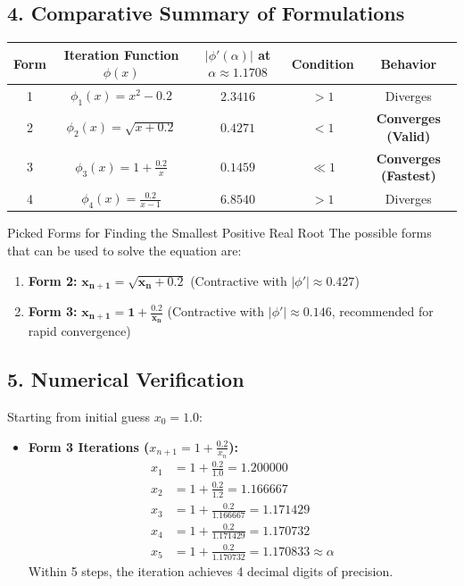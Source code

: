 \documentclass[11pt,a4paper]{article}
\newcommand{\abs}[1]{\left\lvert#1\right\rvert}
\begin{document}
\subsection*{4. Comparative Summary of Formulations}

\begin{center}
\renewcommand{\arraystretch}{1.2}
\small
\begin{tabular}{ccccc}
\toprule
\textbf{Form} & \textbf{Iteration Function $\phi(x)$} & $\abs{\phi'(\alpha)}$ at $\alpha \approx 1.1708$ & \textbf{Condition} & \textbf{Behavior} \\
\midrule
1 & $\phi_1(x) = x^2 - 0.2$ & $2.3416$ & $> 1$ & Diverges \\
2 & $\phi_2(x) = \sqrt{x + 0.2}$ & $0.4271$ & $< 1$ & \textbf{Converges (Valid)} \\
3 & $\phi_3(x) = 1 + \frac{0.2}{x}$ & $0.1459$ & $\ll 1$ & \textbf{Converges (Fastest)} \\
4 & $\phi_4(x) = \frac{0.2}{x - 1}$ & $6.8540$ & $> 1$ & Diverges \\
\bottomrule
\end{tabular}
\end{center}

\begin{answerbox}{Picked Forms for Finding the Smallest Positive Real Root}
The possible forms that can be used to solve the equation are:
\begin{enumerate}[leftmargin=*]
    \item \textbf{Form 2:} $\mathbf{x_{n+1} = \sqrt{x_n + 0.2}}$ \quad (Contractive with $\abs{\phi'} \approx 0.427$)
    \item \textbf{Form 3:} $\mathbf{x_{n+1} = 1 + \frac{0.2}{x_n}}$ \quad (Contractive with $\abs{\phi'} \approx 0.146$, recommended for rapid convergence)
\end{enumerate}
\end{answerbox}

\subsection*{5. Numerical Verification}
Starting from initial guess $x_0 = 1.0$:
\begin{itemize}[leftmargin=*]
    \item \textbf{Form 3 Iterations ($x_{n+1} = 1 + \frac{0.2}{x_n}$):}
    \begin{align*}
        x_1 &= 1 + \frac{0.2}{1.0} = 1.200000 \\
        x_2 &= 1 + \frac{0.2}{1.2} = 1.166667 \\
        x_3 &= 1 + \frac{0.2}{1.166667} = 1.171429 \\
        x_4 &= 1 + \frac{0.2}{1.171429} = 1.170732 \\
        x_5 &= 1 + \frac{0.2}{1.170732} = \mathbf{1.170833} \approx \alpha
    \end{align*}
    Within 5 steps, the iteration achieves 4 decimal digits of precision.
\end{itemize}
\end{document}
